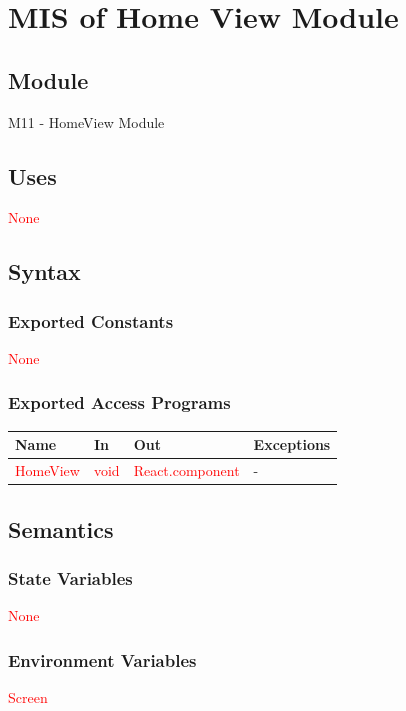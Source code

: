 \documentclass[12pt, titlepage]{article}
\begin{document}
\section{MIS of Home View Module}
\subsection{Module}
M11 - HomeView Module

\subsection{Uses}
\textcolor{red}{None}

\subsection{Syntax}

\subsubsection{Exported Constants}
\textcolor{red}{None}

\subsubsection{Exported Access Programs}
\begin{center}
\begin{tabular}{p{4cm} p{3cm} p{4cm} p{4cm}}
\hline
\textbf{Name} & \textbf{In} & \textbf{Out} & \textbf{Exceptions} \\
\hline
\textcolor{red}{HomeView} & \textcolor{red}{void} & \textcolor{red}{React.component} &  -\\
\hline
\end{tabular}
\end{center}

\subsection{Semantics}

\subsubsection{State Variables}
\textcolor{red}{None}

\subsubsection{Environment Variables}
\textcolor{red}{Screen}
\end{document}
